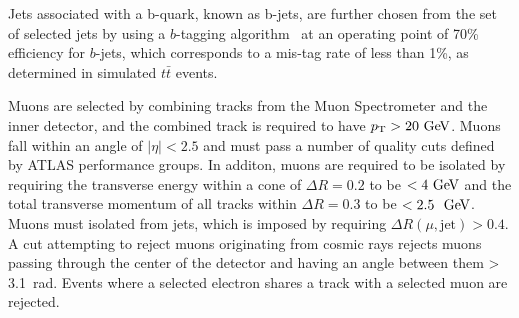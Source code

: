 
Jets associated with a b-quark, known as b-jets, are further chosen from the set of selected jets by using a $b$-tagging algorithm~\cite{ATLAS-CONF-2012-043} at an operating point of 70\% efficiency for $b$-jets, which corresponds to a mis-tag rate of less than 1\%, as determined in simulated $t\bar{t}$ events.


Muons are selected by combining tracks from the Muon Spectrometer and the inner detector, and the combined track is required to have $\pt>20 \GeV$.
Muons fall within an angle of $|\eta|<2.5$ and must pass a number of quality cuts defined by ATLAS performance groups.
In additon, muons are required to be isolated by requiring the transverse energy within a cone of $\Delta R = 0.2$ to be $<4\GeV{}$ and the total transverse momentum of all tracks within $\Delta R = 0.3$ to be $<2.5~\GeV{}$.
Muons must isolated from jets, which is imposed by requiring $\Delta R(\mu,\mathrm{jet})>0.4$.
A cut attempting to reject muons originating from cosmic rays rejects muons passing through the center of the detector and having an angle between them > 3.1~rad.
Events where a selected electron shares a track with a selected muon are rejected.

